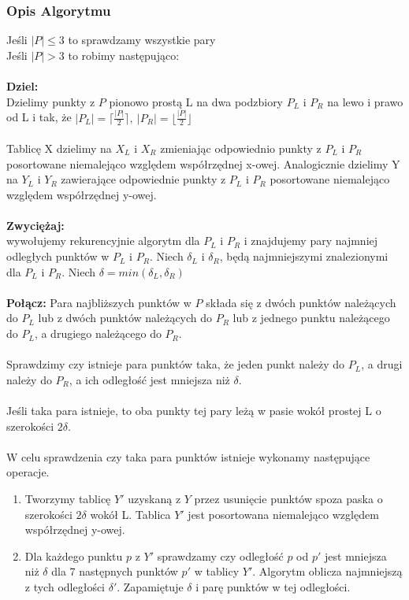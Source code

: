 \subsubsection{Opis Algorytmu}
Jeśli $\vert P \vert \leq 3$ to sprawdzamy wszystkie pary\\
Jeśli $\vert P \vert > 3$ to robimy następująco:\\
\\
\textbf{Dziel: }\\
\tab Dzielimy punkty z $P$ pionowo prostą L na dwa podzbiory $P_L$ i $P_R$ na lewo i prawo od L i tak, że $\vert P_L \vert= \lceil \frac{\vert P \vert}{2}\rceil,\ \vert P_R \vert = \lfloor \frac{\vert P \vert}{2} \rfloor $\\
\\
Tablicę X dzielimy na $X_L$ i $X_R$ zmieniając odpowiednio punkty z $P_L$ i $P_R$ posortowane niemalejąco względem współrzędnej x-owej. Analogicznie dzielimy Y na $Y_L$ i $Y_R$ zawierające odpowiednie punkty z $P_L$ i $P_R$ posortowane niemalejąco względem współrzędnej y-owej.\\
\\
\textbf{Zwyciężaj: }\\
wywołujemy rekurencyjnie algorytm dla $P_L$ i $P_R$ i znajdujemy pary najmniej odległych punktów w $P_L$ i $P_R$. Niech $\delta_L$ i $\delta_R$, będą najmniejszymi znalezionymi dla $P_L$ i $P_R$. Niech $\delta=min(\delta_L,\delta_R)$\\
\\
\textbf{Połącz: }
Para najbliższych punktów w $P$ składa się z dwóch punktów należących do $P_L$ lub z dwóch punktów należących do $P_R$ lub z jednego punktu należącego do $P_L$, a drugiego należącego do $P_R$.\\
\\
Sprawdzimy czy istnieje para punktów taka, że jeden punkt należy do $P_L$, a drugi należy do $P_R$, a ich odległość jest mniejsza niż $\delta$.\\
\\
Jeśli taka para istnieje, to oba punkty tej pary leżą w pasie wokół prostej L o szerokości $2\delta$.\\
\\
W celu sprawdzenia czy taka para punktów istnieje wykonamy następujące operacje. \\
\begin{enumerate}
\item Tworzymy tablicę $Y'$ uzyskaną z $Y$ przez usunięcie punktów spoza paska o szerokości $2\delta$ wokół L. Tablica $Y'$ jest posortowana niemalejąco względem współrzędnej y-owej.
\item Dla każdego punktu $p$ z $Y'$ sprawdzamy czy odległość $p$ od $p'$ jest mniejsza niż $\delta$ dla 7 następnych punktów $p'$ w tablicy $Y'$. Algorytm oblicza najmniejszą z tych odległości $\delta'$. Zapamiętuje $\delta$ i parę punktów w tej odległości.
\end{enumerate}
